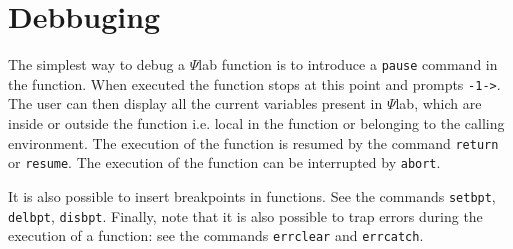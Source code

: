 \section{Debbuging}
The simplest way to debug a $\Psi$lab function is to introduce
a {\tt pause} command in the function.
When executed the function stops at this point and prompts {\tt -1->}.
The user can then display all the current variables present in $\Psi$lab,
which are inside or outside the function i.e. local in the function
or belonging to the calling environment. The execution of the function
is resumed by the command {\tt return} or {\tt resume}.
The execution of the function can be interrupted by {\tt abort}.

It is also possible to insert breakpoints in functions. See the commands
{\tt setbpt}, {\tt delbpt}, {\tt disbpt}.
Finally, note that it is also possible to trap errors during the 
execution of a function: 
see the commands {\tt errclear} and {\tt errcatch}.
